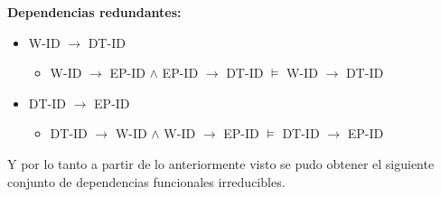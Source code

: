 \documentclass{report}
\begin{document}
    \textbf{Dependencias redundantes:}
    \begin{itemize}
        \item W-ID $\rightarrow$ DT-ID
        \begin{itemize}
            \item W-ID $\rightarrow$ EP-ID $\land$  EP-ID  $\rightarrow$ DT-ID $\models$ W-ID $\rightarrow$ DT-ID \newline
        \end{itemize}
        
        \item DT-ID $\rightarrow$ EP-ID
        \begin{itemize}
            \item DT-ID $\rightarrow$ W-ID $\land$  W-ID $\rightarrow$ EP-ID $\models$ DT-ID $\rightarrow$ EP-ID  \newline
        \end{itemize}
    \end{itemize}

    Y por lo tanto a partir de lo anteriormente visto se pudo obtener el siguiente conjunto de dependencias funcionales irreducibles. \newline
\end{document}
